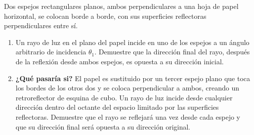 \item Dos espejos rectangulares planos, ambos perpendiculares a una hoja de papel horizontal, se colocan borde a borde, con sus superficies reflectoras perpendiculares entre sí.
\begin{enumerate}
    \item Un rayo de luz en el plano del papel incide en uno de los espejos a un ángulo arbitrario de incidencia $\theta_1$. Demuestre que la dirección final del rayo, después de la reflexión desde ambos espejos, es opuesta a su dirección inicial.
    \item \textbf{¿Qué pasaría si?} El papel es sustituido por un tercer espejo plano que toca los bordes de los otros dos y se coloca perpendicular a ambos, creando un retroreflector de esquina de cubo. Un rayo de luz incide desde cualquier dirección dentro del octante del espacio limitado por las superficies reflectoras. Demuestre que el rayo se reflejará una vez desde cada espejo y que su dirección final será opuesta a su dirección original.
\end{enumerate}